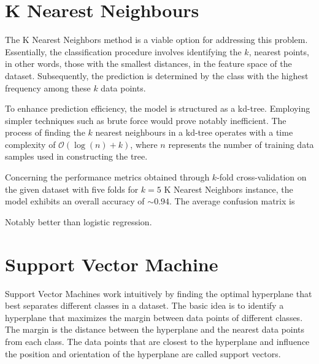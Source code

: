 \documentclass{article}
\begin{document}
\section{K Nearest Neighbours}
The K Nearest Neighbors method is a viable option for addressing this problem. Essentially, the classification procedure involves identifying the $k$, nearest points, in other words, those with the smallest distances, in the feature space of the dataset. Subsequently, the prediction is determined by the class with the highest frequency among these $k$ data points.

To enhance prediction efficiency, the model is structured as a kd-tree. Employing simpler techniques such as brute force would prove notably inefficient. The process of finding the $k$ nearest neighbours in a kd-tree operates with a time complexity of $\mathcal{O}(\log(n) + k)$, where $n$ represents the number of training data samples used in constructing the tree.

Concerning the performance metrics obtained through $k$-fold cross-validation on the given dataset with five folds for $k=5$ K Nearest Neighbors instance, the model exhibits an overall accuracy of  $\sim 0.94$. The average confusion matrix is 
\begin{center}
\end{center}
Notably better than logistic regression.

\section{Support Vector Machine}

Support Vector Machines work intuitively by finding the optimal hyperplane that best separates different classes in a dataset. The basic idea is to identify a hyperplane that maximizes the margin between data points of different classes. The margin is the distance between the hyperplane and the nearest data points from each class. The data points that are closest to the hyperplane and influence the position and orientation of the hyperplane are called support vectors. 
\end{document}
